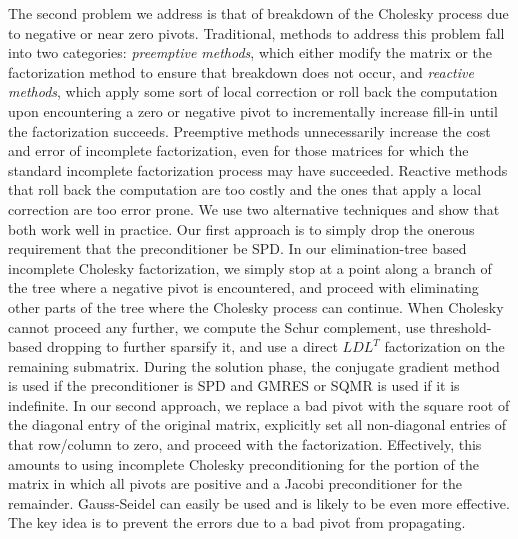\documentclass{report}
\begin{document}
The second problem we address is that of breakdown of the Cholesky
process due to negative or near zero pivots. Traditional, methods
to address this problem fall into two categories:
{\em preemptive methods}, which either modify the matrix or the
factorization method to ensure that breakdown does not occur, and
{\em reactive methods}, which apply some sort of local correction or roll
back the computation upon encountering a zero or negative pivot
to incrementally increase fill-in until the factorization succeeds.
Preemptive methods unnecessarily increase the cost and error of incomplete
factorization, even for those matrices for which the standard
incomplete factorization process may have succeeded. Reactive methods
that roll back the computation are too costly and the ones that apply
a local correction are too error prone. We use two alternative techniques
and show that both work well in practice. Our first approach is to
simply drop the onerous requirement that the preconditioner be
SPD. In our elimination-tree based incomplete Cholesky factorization,
we simply stop at a point along a branch of the tree where a negative
pivot is encountered, and proceed with eliminating other parts of the
tree where the Cholesky process can continue. When Cholesky cannot proceed
any further, we compute the Schur complement, use threshold-based dropping
to further sparsify it, and use a direct $LDL^T$ factorization on the
remaining submatrix. During the solution phase, the conjugate gradient
method is used if the preconditioner is SPD and GMRES
or SQMR is used if it is indefinite. In our second approach,
we replace a bad pivot with the square root of the diagonal
entry of the original matrix, explicitly set all non-diagonal entries
of that row/column to zero, and proceed with the factorization. Effectively,
this amounts to using incomplete Cholesky preconditioning
for the portion of the matrix in which all pivots are positive and a
Jacobi preconditioner for the remainder. Gauss-Seidel can easily be
used and is likely to be even more effective. The key idea is to prevent the
errors due to a bad pivot from propagating.
\end{document}
